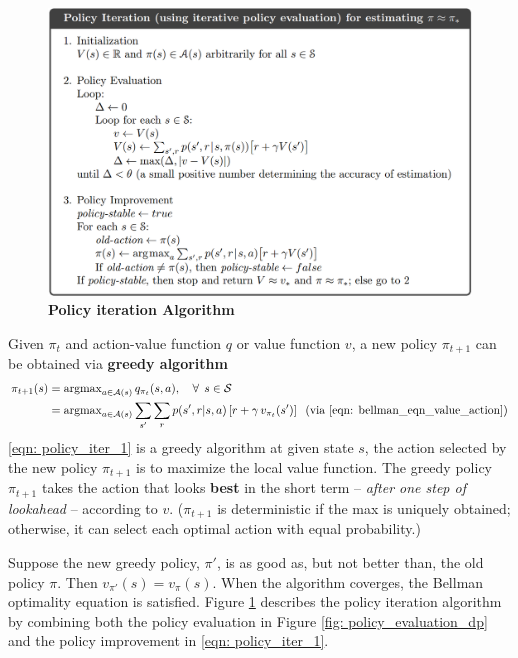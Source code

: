 \documentclass[11pt]{article}
\begin{document}
\begin{figure}
\begin{minipage}[t]{1\linewidth}
  \centering
  \centerline{\includegraphics[scale = 0.3]{policy_iter_algo.png}}
\end{minipage}
\caption{\footnotesize{\textbf{Policy iteration Algorithm}}}
\label{fig: policy_iteration_algo}
\end{figure}

Given $\pi_{t}$ and action-value function $q$ or value function $v$, a new policy $\pi_{t+1}$ can be obtained via \textbf{greedy algorithm} 
\begin{align}
\pi_{t+1}(s) &= \operatorname{argmax}_{a \in {\mathcal A}(s)}q_{\pi_{t}}(s, a), \quad \forall\,\; s\in {\mathcal S} \nonumber\\
&= \operatorname{argmax}_{a \in {\mathcal A}(s)}\sum_{s'}\sum_{r}p(s', r| s, a)\left[r + \gamma\,v_{\pi_{t}}(s')\right] \;\; (\text{via \eqref{eqn: bellman_eqn_value_action}}) \label{eqn: policy_iter_1}
\end{align} \eqref{eqn: policy_iter_1} is a greedy algorithm at given state $s$, the action selected by the new policy $\pi_{t+1}$ is to maximize the local value function. The greedy  policy $\pi_{t+1}$ takes the action that looks \textbf{best} in the short term -- \emph{after one step of lookahead} -- according to $v$.  ($\pi_{t+1}$ is deterministic if the max is uniquely obtained; otherwise, it can select each optimal action with equal probability.) 

Suppose the new greedy policy, $\pi'$, is as good as, but not better than, the old policy $\pi$. Then $v_{\pi'}(s) = v_{\pi}(s)$. When the algorithm coverges, the Bellman optimality equation is satisfied.  Figure \ref{fig: policy_iteration_algo} describes the policy iteration algorithm by combining both the policy evaluation in Figure \ref{fig: policy_evaluation_dp} and the policy improvement in \eqref{eqn: policy_iter_1}. 
\end{document}
